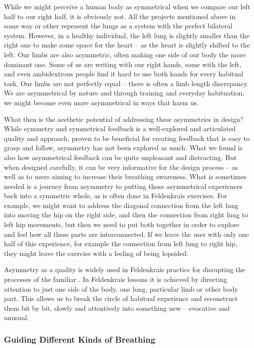 While we might perceive a human body as symmetrical when we compare our left half to our right half, it is obviously not. All the projects mentioned above in some way or other represent the lungs as a system with the perfect bilateral system. However, in a healthy individual, the left lung is slightly smaller than the right one to make some space for the heart -- as the heart is slightly shifted to the left. Our limbs are also asymmetric, often making one side of our body the more dominant one. Some of us are writing with our right hands, some with the left, and even ambidextrous people find it hard to use both hands for every habitual task. Our limbs are not perfectly equal -- there is often a limb length discrepancy. We are asymmetrical by nature and through training and everyday habituation, we might become even more asymmetrical in ways that harm us.

What then is the aesthetic potential of addressing these asymmetries in design? While symmetry and symmetrical feedback is a well-explored and articulated quality and approach, proven to be beneficial for creating feedback that is easy to grasp and follow, asymmetry has not been explored as much. What we found is also how asymmetrical feedback can be quite unpleasant and distracting. But when designed carefully, it can be very informative for the design process -- as well as to users aiming to increase their breathing awareness. What is sometimes needed is a journey from asymmetry to putting those asymmetrical experiences back into a symmetric whole, as is often done in Feldenkrais exercises. For example, we might want to address the diagonal connection from the left lung into moving the hip on the right side, and then the connection from right lung to left hip movements, but then we need to put both together in order to explore and feel how all these parts are interconnected. If we leave the user with only one half of this experience, for example the connection from left lung to right hip, they might leave the exercise with a feeling of being lopsided.

Asymmetry as a quality is widely used in Feldenkrais practice for disrupting the processes of the familiar \cite{worth_symmetry_2015}. In Feldenkrais lessons it is achieved by directing attention to just one side of the body, one lung, particular limb or other body part. This allows us to break the circle of habitual experience and reconstruct them bit by bit, slowly and attentively into something new -- evocative and unusual.

\subsubsection{Guiding Different Kinds of Breathing}


